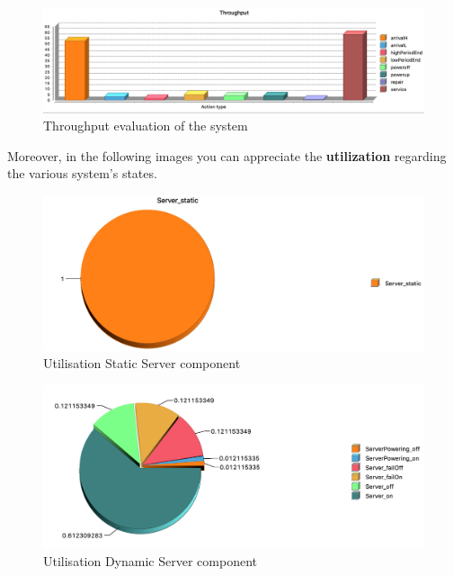 \documentclass{article}
\begin{document}
\begin{figure}[H]
    \centering
    \includegraphics[width=16.5cm]{throughput-graph.png}
    \caption{Throughput evaluation of the system}
    \label{fig:throughput-graph}
\end{figure}

\noindent Moreover, in the following images you can appreciate the \textbf{utilization} regarding the various system's states.

\begin{figure}[H]
    \centering
    \includegraphics[width=16.5cm]{utilisation-static-server.png}
    \caption{Utilisation Static Server component}
    \label{fig:utilisation-static-server}
\end{figure}

\begin{figure}[H]
    \centering
    \includegraphics[width=16.5cm]{utilisation-dynamic-server.png}
    \caption{Utilisation Dynamic Server component}
    \label{fig:utilisation-dynamic-server}
\end{figure}
\end{document}
